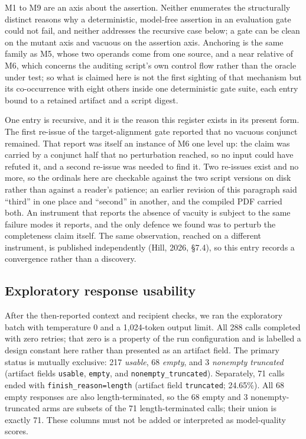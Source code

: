 \documentclass[11pt]{article}
\begin{document}
M1 to M9 are an axis about the assertion. Neither enumerates the structurally distinct reasons why a
deterministic, model-free assertion in an evaluation gate could not fail, and neither addresses the recursive
case below; a gate can be clean on the mutant axis and vacuous on the assertion axis. Anchoring is the same
family as M5, whose two operands come from one source, and a near relative of M6, which concerns the auditing
script's own control flow rather than the oracle under test; so what is claimed here is not the first sighting
of that mechanism but its co-occurrence with eight others inside one deterministic gate suite, each entry
bound to a retained artifact and a script digest.

One entry is recursive, and it is the reason this register exists in its present form. The first re-issue of
the target-alignment gate reported that no vacuous conjunct remained. That report was itself an instance of M6
one level up: the claim was carried by a conjunct half that no perturbation reached, so no input could have
refuted it, and a second re-issue was needed to find it. Two re-issues exist and no more, so the ordinals here
are checkable against the two script versions on disk rather than against a reader's patience; an earlier
revision of this paragraph said ``third'' in one place and ``second'' in another, and the compiled PDF carried
both. An instrument that reports the absence of vacuity is
subject to the same failure modes it reports, and the only defence we found was to perturb the completeness
claim itself. The same observation, reached on a different instrument, is published independently (Hill, 2026, \S7.4), so this entry records a convergence rather than a discovery.

\subsection{Exploratory response usability}
After the then-reported context and recipient checks, we ran the exploratory batch with temperature 0 and a 1,024-token output limit. All 288 calls completed with zero retries; that zero is a property of the run configuration and is labelled a design constant here rather than presented as an artifact field. The primary status is mutually exclusive: 217 \emph{usable}, 68 \emph{empty}, and 3 \emph{nonempty truncated} (artifact fields \texttt{usable}, \texttt{empty}, and \texttt{nonempty\_truncated}). Separately, 71 calls ended with \texttt{finish\_reason=length} (artifact field \texttt{truncated}; 24.65\%). All 68 empty responses are also length-terminated, so the 68 empty and 3 nonempty-truncated arms are subsets of the 71 length-terminated calls; their union is exactly 71. These columns must not be added or interpreted as model-quality scores.
\end{document}
